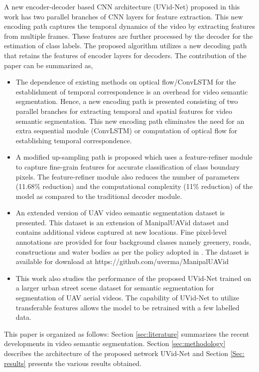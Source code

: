 \documentclass[journal]{IEEEtran}
\begin{document}
\par A new encoder-decoder based CNN architecture (UVid-Net) proposed in this work has two parallel branches of CNN layers for feature extraction. This new encoding path captures the temporal dynamics of the video by extracting features from multiple frames.  These features are further processed by the decoder for the estimation of class labels. The proposed algorithm utilizes a new decoding path that retains the features of encoder layers for decoders. The contribution of the paper can be summarized as,
\begin{itemize}
    \item The dependence of existing methods on optical flow/ConvLSTM for the establishment of temporal correspondence is an overhead for video semantic segmentation. Hence, a new encoding path is presented consisting of two parallel branches for extracting temporal and spatial features for video semantic segmentation. This new encoding path eliminates the need for an extra sequential module (ConvLSTM) or computation of optical flow for establishing temporal correspondence. 
    
    \item  A modified up-sampling path is proposed which uses a feature-refiner module to capture fine-grain features for accurate classification of class boundary pixels. The feature-refiner module also reduces the number of parameters (11.68\% reduction) and the computational complexity (11\% reduction) of the model as compared to the traditional decoder module.
    
  
\item An extended version of UAV video semantic segmentation dataset is presented. This dataset is an extension of ManipalUAVid dataset \cite{19} and contains additional videos captured at new locations. Fine pixel-level annotations are provided for four background classes namely greenery, roads, constructions and water bodies as per the policy adopted in \cite{19}. The dataset is available for download at https://github.com/uverma/ManipalUAVid 
	\item This work also studies the performance of the proposed UVid-Net trained on a larger urban street scene dataset for semantic segmentation for segmentation of UAV aerial videos. The capability of UVid-Net to utilize transferable features allows the model to be retrained with a few labelled data.
	
\end{itemize}

\par This paper is organized as follows: Section \ref{sec:literature} summarizes the recent developments in video semantic segmentation. Section \ref{sec:methodology} describes the architecture of the proposed network UVid-Net and Section \ref{Sec: results} presents the various results obtained. 
\end{document}
